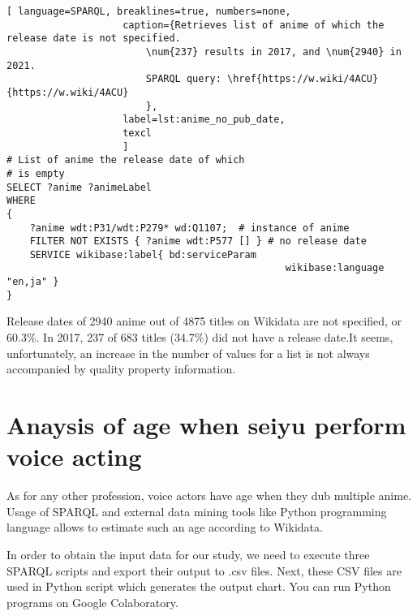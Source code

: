 \begin{lstlisting}[ language=SPARQL, breaklines=true, numbers=none,
                    caption={Retrieves list of anime of which the release date is not specified.
                        \num{237} results in 2017, and \num{2940} in 2021.
                        SPARQL query: \href{https://w.wiki/4ACU}{https://w.wiki/4ACU}
                        },
                    label=lst:anime_no_pub_date,
                    texcl 
                    ]
# List of anime the release date of which
# is empty
SELECT ?anime ?animeLabel
WHERE
{
    ?anime wdt:P31/wdt:P279* wd:Q1107;  # instance of anime
    FILTER NOT EXISTS { ?anime wdt:P577 [] } # no release date
    SERVICE wikibase:label{ bd:serviceParam
			  									wikibase:language "en,ja" }
}
\end{lstlisting}%

Release dates of \num{2940} anime out of \num{4875} titles on Wikidata are not specified, or \num{60.3}\%. In 2017, \num{237} of \num{683} titles (\num{34.7}\%) did not have a release date.It seems, unfortunately, an increase in the number of values for a list is not always accompanied by quality property information.

\section{Anaysis of age when seiyu perform voice acting}

As for any other profession, voice actors have age when they dub multiple anime. Usage of SPARQL and external data mining tools like Python programming language allows to estimate such an age according to Wikidata.

In order to obtain the input data for our study, we need to execute three SPARQL scripts and export their output to .csv files. Next, these CSV files are used in Python script which generates the output chart. You can run Python programs on Google Colaboratory.

